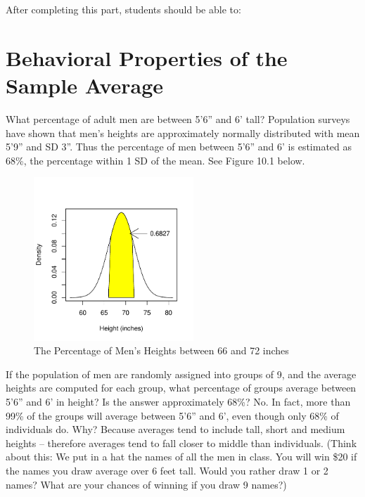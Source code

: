 \documentclass[11pt, chapterprefix=true]{scrbook}\usepackage[]{graphicx}\usepackage[]{color}
\begin{document}
After completing this part, students should be able to:


\section{Behavioral Properties of the Sample Average}

What percentage of adult men are between 5'6'' and 6' tall?  Population surveys have shown that men's heights are approximately normally distributed with mean 5'9'' and SD 3''.  Thus the percentage of men between 5'6'' and 6' is estimated as 68\%, the percentage within 1 SD of the mean.  See Figure 10.1 below.

\begin{figure}[ht]
\caption{The Percentage of Men's Heights between 66 and 72 inches}



{\centering \includegraphics[width=6cm]{figure/LBL10-1} 

}




\end{figure}

If the population of men are randomly assigned into groups of 9, and the average heights are computed for each group, what percentage of groups average between 5'6'' and 6' in height?    Is the answer approximately 68\%?  No.  In fact, more than 99\% of the groups will average between 5'6'' and 6', even though only 68\% of individuals do.  Why?  Because averages tend to include tall, short and medium heights -- therefore averages tend to fall closer to middle than individuals.   (Think about this:  We put in a hat the names of all the men in class.  You will win \$20 if the names you draw average over 6 feet tall.  Would you rather draw 1 or 2 names?  What are your chances of winning if you draw 9 names?)  
\end{document}
